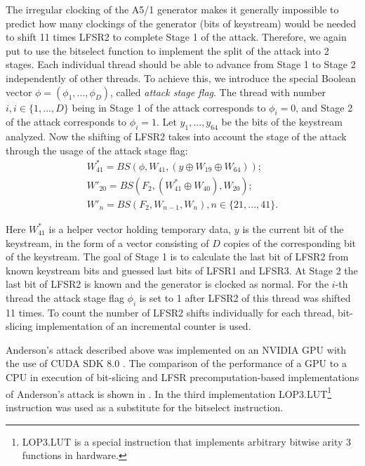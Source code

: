 \documentclass[runningheads,a4paper]{llncs}[2015/06/24]
\begin{document}
The irregular clocking of the A5/1 generator makes it generally impossible to
predict how many clockings of the generator (bits of keystream) would be
needed to shift 11 times LFSR2 to complete Stage 1 of the attack.
Therefore, we again put to use the bitselect function to implement the split of
the attack into 2 stages. Each individual thread should be able to advance from Stage 1 to Stage 2 
independently of other threads. To achieve this, we introduce the special 
Boolean vector $\phi = (\phi_1,...,\phi_D)$, called
\textit{attack stage flag}. The thread with number $i, i \in \{1,...,D\}$ being in
Stage 1 of the attack corresponds to $\phi_i = 0$, and Stage 2 of the
attack corresponds to $\phi_i=1$. Let $y_1,...,y_{64}$ be the bits of the
keystream analyzed. Now the shifting of LFSR2 takes into account the stage of the
attack through the usage of the attack stage flag: 
\begin{gather*} 
	W^\ast_{41} = BS(\phi, W_{41},(y \oplus W_{19} \oplus W_{64}));\\
	W'_{20} = BS(F_2,(W^\ast_{41} \oplus W_{40}), W_{20});\\
	W'_n = BS(F_2,W_{n-1},W_n), n \in \{21,...,41\}. 
\end{gather*}

Here $W^\ast_{41}$ is a helper vector holding temporary data, $y$ is the
current bit of the keystream, in the form of a vector consisting of $D$ copies
of the corresponding bit of the keystream. The goal of Stage 1 is to
calculate the last bit of LFSR2 from known keystream bits and 
guessed last bits of LFSR1 and LFSR3. At Stage 2 the last bit of
LFSR2 is known and the generator is clocked as normal. For the
$i$-th thread the attack stage flag $\phi_i$ is set to 1 after LFSR2 of this thread 
was shifted 11 times. To count the number of LFSR2 shifts individually for each thread, 
bit-slicing implementation of an incremental counter is used.

Anderson's attack described above was implemented on an NVIDIA GPU
with the use of CUDA SDK 8.0 \cite{CudaSdk8}. The comparison of the performance of
a GPU to a CPU in execution of bit-slicing and LFSR precomputation-based
\cite{DBLP:conf/fse/BiryukovSW00} implementations of Anderson's attack is shown in
. In the third implementation LOP3.LUT\footnote{LOP3.LUT is a special instruction that implements
arbitrary bitwise arity 3 functions in hardware.} instruction was used as a substitute
for the bitselect instruction.
\end{document}

